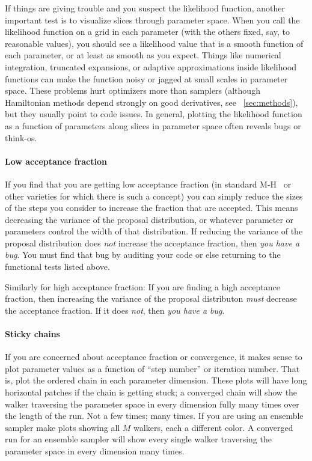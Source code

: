 \documentclass[modern]{aastex61}
\newcommand{\MCMC}{\acronym{MCMC}}
\begin{document}
If things are giving trouble and you suspect the likelihood function,
  another important test is to visualize slices through parameter space.
When you call the likelihood function on a grid in each parameter
  (with the others fixed, say, to reasonable values),
  you should see a likelihood value that is a smooth function of each parameter,
  or at least as smooth as you expect.
Things like numerical integration,
  truncated expansions,
  or adaptive approximations
  inside likelihood functions
  can make the function noisy or jagged at small scales in parameter space.
These problems hurt optimizers more than samplers (although Hamiltonian
  methods depend strongly on good derivatives, see \sectionname~\ref{sec:methods}),
  but they usually point to code issues.
In general, plotting the likelihood function as a function of parameters along
  slices in parameter space often reveals bugs or think-os.

\paragraph{Low acceptance fraction}
If you find that you are getting low acceptance fraction
  (in standard M-H \MCMC\ or other varieties for which there is such a concept)
  you can simply reduce the sizes of the steps you consider to increase the fraction that are accepted.
This means decreasing the variance of the proposal distribution,
  or whatever parameter or parameters control the width of that distribution.
If reducing the variance of the proposal distribution does \emph{not}
increase the acceptance fraction, then \emph{you have a bug}.
You must find that bug by auditing your code or else returning to the
functional tests listed above.

Similarly for high acceptance fraction:
If you are finding a high acceptance fraction, then increasing the
variance of the proposal distributon \emph{must} decrease the
acceptance fraction.
If it does \emph{not}, then \emph{you have a bug}.

\paragraph{Sticky chains}
If you are concerned about acceptance fraction or convergence,
  it makes sense to plot parameter values as a function of ``step number'' or iteration number.
That is, plot the ordered chain in each parameter dimension.
These plots will have long horizontal patches if the chain is getting stuck;
  a converged chain will show the walker traversing the parameter space in every dimension fully many times
  over the length of the run.
Not a few times; many times.
If you are using an ensemble sampler
  make plots showing all $M$ walkers, each a different color.
A converged run for an ensemble sampler will show every single walker traversing the parameter space
  in every dimension many times.
\end{document}
